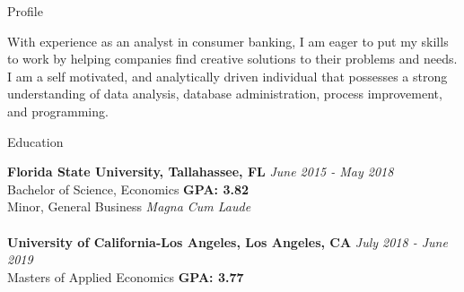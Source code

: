 \documentclass{resume} %
\begin{document}
\vspace{-1.3em}
\begin{rSection}{Profile}

With experience as an analyst in consumer banking, I am eager to put my skills to work by helping companies find creative solutions to their problems and needs. I am a self motivated, and analytically driven individual that possesses a strong understanding of data analysis, database administration, process improvement, and programming. 

\end{rSection}

\begin{rSection}{Education}

{\bf Florida State University, Tallahassee, FL} \hfill {\em June 2015 - May 2018} 
\\ Bachelor of Science, Economics \hfill { \bf GPA: 3.82}
\\ Minor, General Business \hfill {\em Magna Cum Laude}
\\ 
\\{\bf University of California-Los Angeles, Los Angeles, CA} \hfill {\em July 2018 - June 2019} 
\\ Masters of Applied Economics\hfill { \bf GPA: 3.77 }

\end{rSection}
\end{document}
